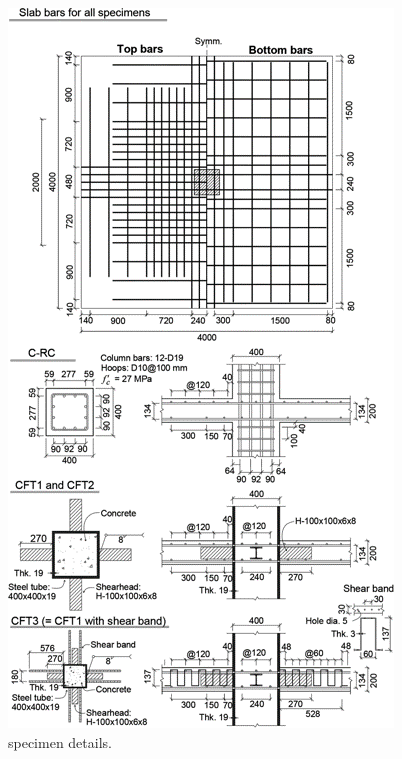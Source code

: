     \begin{figure}\centering
    \includegraphics[width=\columnwidth]{Figures/l2019f3.png}
    \caption{\cite{lee2019seismic} specimen details.}
    \label{l2019f3}
    \end{figure}


